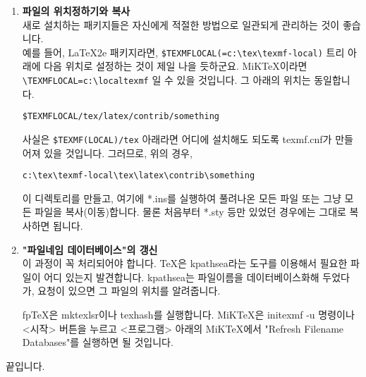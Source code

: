 \begin{enumerate}[{(}1{)}]
\begin{description}
					   \textbf{latex something.dtx} \\
					   \textbf{latex something.dtx} (두 번 실행하는 것이 좋습니다.) \\
					   이 결과 something.dvi가 얻어집니다.
			\end{description}

	\clearpage
	\item  	\textbf{파일의 위치정하기와 복사} \\
			새로 설치하는 패키지들은 자신에게 적절한 방법으로 일관되게 관리하는 것이 좋습니다. \\
			예를 들어, LaTeX2e 패키지라면, \verb|$TEXMFLOCAL(=c:\tex\texmf-local)| 트리 아래에 다음 
			위치로 설정하는 것이 제일 나을 듯하군요.
			MiKTeX이라면 \verb|\TEXMFLOCAL=c:\localtexmf| 일 수 있을 것입니다. 그 아래의 위치는 동일합니다.

  
			\verb|$TEXMFLOCAL/tex/latex/contrib/something|

			사실은 \verb|$TEXMF(LOCAL)/tex| 아래라면 어디에
			설치해도 되도록 texmf.cnf가 만들어져 있을 것입니다. 그러므로, 위의 경우,

			  \verb|c:\tex\texmf-local\tex\latex\contrib\something|

			이 디렉토리를 만들고, 여기에 *.ins를 실행하여 풀려나온 모든 파일 또는 그냥 모든 파일을 복사(이동)합니다.
			물론 처음부터 *.sty 등만 있었던 경우에는 그대로 복사하면 됩니다.
	
	\item  	\textbf{"파일네임 데이터베이스"의 갱신 }\\
			이 과정이 꼭 처리되어야 합니다. 
			TeX은 kpathsea라는 도구를 이용해서 필요한 파일이 어디 있는지 발견합니다.
			kpathsea는 파일이름을 데이터베이스화해 두었다가, 요청이 있으면 그 파일의 위치를 알려줍니다.
		
			fpTeX은 mktexlsr이나 texhash를 실행합니다.
			MiKTeX은 initexmf -u 명령이나 <시작> 버튼을 누르고 <프로그램> 아래의 MiKTeX에서
			"Refresh Filename Databases"를 실행하면 될 것입니다.
	\end{enumerate}

	끝입니다.
		
		
